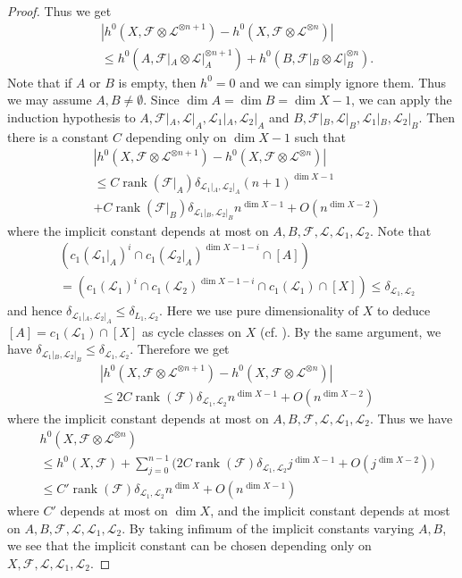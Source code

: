 \documentclass[12pt]{amsart}
\theoremstyle{plain}
\theoremstyle{definition}
\numberwithin{equation}{section}
\def\L{{ \mathcal{L}}}
\DeclareMathOperator{\rank}{rank}
\renewcommand{\d}{\delta}
\begin{document}
\begin{proof}
Thus we get
\begin{align}
&|h^{0}(X, \mathcal{F} \otimes \L^{ \otimes n+1}) - h^{0}(X, \mathcal{F} \otimes \L^{ \otimes n})  |\\
&\leq
h^{0}(A, \mathcal{F}|_{A}\otimes \L|_{A}^{ \otimes n+1}) + h^{0}(B,  \mathcal{F}|_{B}\otimes \L|_{B}^{ \otimes n} ).
\end{align}
Note that if $A$ or $B$ is empty, then $h^{0} = 0$ and we can simply ignore them.
Thus we may assume $A, B  \neq \emptyset$.
Since $\dim A = \dim B = \dim X - 1$, we can apply the induction hypothesis to
$A, \mathcal{F}|_{A}, \L|_{A}, \L_{1}|_{A}, \L_{2}|_{A}$ and $B, \mathcal{F}|_{B}, \L|_{B}, \L_{1}|_{B}, \L_{2}|_{B}$.
Then there is a constant $C$ depending only on $\dim X -1$ such that
\begin{align}
&|h^{0}(X, \mathcal{F} \otimes \L^{ \otimes n+1}) - h^{0}(X, \mathcal{F} \otimes \L^{ \otimes n})  |\\
&\leq
C \rank (\mathcal{F}|_{A})  \d_{\L_{1}|_{A}, \L_{2}|_{A}} (n+1)^{\dim X - 1}\\
&+C\rank (\mathcal{F}|_{B})  \d_{\L_{1}|_{B}, \L_{2}|_{B}} n^{\dim X - 1}
+O(n^{\dim X - 2})
\end{align}
where the implicit constant depends at most on $A, B, \mathcal{F}, \L, \L_{1}, \L_{2}$.
Note that
\begin{align}
&(c_{1}(\L_{1}|_{A})^{i} \cap c_{1}(\L_{2}|_{A})^{\dim X -1  - i} \cap [A]) \\
&=
(c_{1}(\L_{1})^{i} \cap c_{1}(\L_{2})^{\dim X -1  - i} \cap c_{1}(\L_{1}) \cap [X]) 
\leq \d_{\L_{1}, \L_{2}}
\end{align}
and hence $\d_{\L_{1}|_{A}, \L_{2}|_{A}} \leq \d_{L_{1}, \L_{2}}$.
Here we use pure dimensionality of $X$ to deduce $[A] = c_{1}(\L_{1}) \cap [X]$ as cycle classes on $X$
(cf. \cite[Lemma 1.7.2 or Proposition 2.6 (d)]{fulintersec}).
By the same argument, we have $\d_{\L_{1}|_{B}, \L_{2}|_{B}} \leq \d_{\L_{1}, \L_{2}}$.
Therefore we get
\begin{align}
&|h^{0}(X, \mathcal{F} \otimes \L^{ \otimes n+1}) - h^{0}(X, \mathcal{F} \otimes \L^{ \otimes n})  |\\
&\leq
2C \rank( \mathcal{F})\d_{\L_{1}, \L_{2}} n^{\dim X -1 } + O(n^{\dim X - 2})
\end{align}
where the implicit constant depends at most on $A, B, \mathcal{F}, \L, \L_{1}, \L_{2}$.
 Thus we have
 \begin{align}
& h^{0}(X, \mathcal{F} \otimes \L^{ \otimes n}) \\
& \leq
h^{0}(X, \mathcal{F})
 + \sum_{j=0}^{n-1} \big( 2C \rank( \mathcal{F})\d_{\L_{1}, \L_{2}} j^{\dim X -1 } + O(j^{\dim X - 2}) \big)\\
 &\leq
 C' \rank( \mathcal{F}) \d_{\L_{1}, \L_{2}} n^{\dim X} + O(n^{\dim X -1})
 \end{align}
where $C'$ depends at most on $\dim X$, and
the implicit constant depends at most on $A, B, \mathcal{F}, \L, \L_{1}, \L_{2}$.
By taking infimum of the implicit constants varying $A,B$, we see
that the implicit constant can be chosen depending only on $X, \mathcal{F}, \L, \L_{1}, \L_{2}$.
\end{proof}
\end{document}
